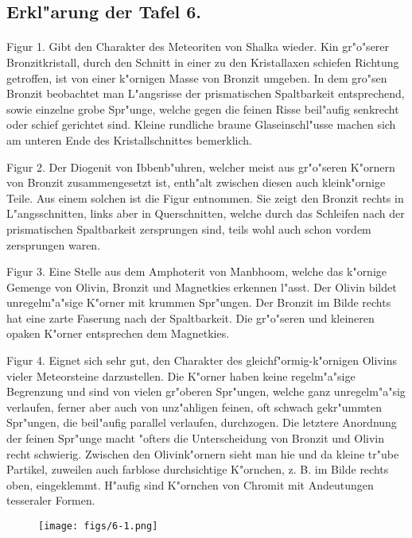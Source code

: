 \documentclass[a4paper, 11pt, oneside, polutonikogreek, german]{article}
\begin{document}
\subsection{Erkl"arung der Tafel 6.}
\paragraph{}
Figur 1. Gibt den Charakter des Meteoriten von Shalka wieder. Kin gr"o"serer Bronzitkristall, durch den Schnitt in einer zu den Kristallaxen schiefen Richtung getroffen, ist von einer k"ornigen Masse von Bronzit umgeben. In dem gro"sen Bronzit beobachtet man L"angsrisse der prismatischen Spaltbarkeit entsprechend, sowie einzelne grobe Spr"unge, welche gegen die feinen Risse beil"aufig senkrecht oder schief gerichtet sind. Kleine rundliche braune Glaseinschl"usse machen sich am unteren Ende des Kristallschnittes bemerklich.

Figur 2. Der Diogenit von Ibbenb"uhren, welcher meist aus gr"o"seren K"ornern von Bronzit zusammengesetzt ist, enth"alt zwischen diesen auch kleink"ornige Teile. Aus einem solchen ist die Figur entnommen. Sie zeigt den Bronzit rechts in L"angsschnitten, links aber in Querschnitten, welche durch das Schleifen nach der prismatischen Spaltbarkeit zersprungen sind, teils wohl auch schon vordem zersprungen waren.

Figur 3. Eine Stelle aus dem Amphoterit von Manbhoom, welche das k"ornige Gemenge von Olivin, Bronzit und Magnetkies erkennen l"asst. Der Olivin bildet unregelm"a"sige K"orner mit krummen Spr"ungen. Der Bronzit im Bilde rechts hat eine zarte Faserung nach der Spaltbarkeit. Die gr"o"seren und kleineren opaken K"orner entsprechen dem Magnetkies.

Figur 4. Eignet sich sehr gut, den Charakter des gleichf"ormig-k"ornigen Olivins vieler Meteorsteine darzustellen. Die K"orner haben keine regelm"a"sige Begrenzung und sind von vielen gr"oberen Spr"ungen, welche ganz unregelm"a"sig verlaufen, ferner aber auch von unz"ahligen feinen, oft schwach gekr"ummten Spr"ungen, die beil"aufig parallel verlaufen, durchzogen. Die letztere Anordnung der feinen Spr"unge macht "ofters die Unterscheidung von Bronzit und Olivin recht schwierig. Zwischen den Olivink"ornern sieht man hie und da kleine tr"ube Partikel, zuweilen auch farblose durchsichtige K"ornchen, z. B. im Bilde rechts oben, eingeklemmt. H"aufig sind K"ornchen von Chromit mit Andeutungen tesseraler Formen.
\clearpage

\vspace*{\fill}
\begin{figure}[H]
\centering
\texttt{[image: figs/6-1.png]}
\caption{}
\end{figure}
\vspace*{\fill}
\clearpage
\end{document}
